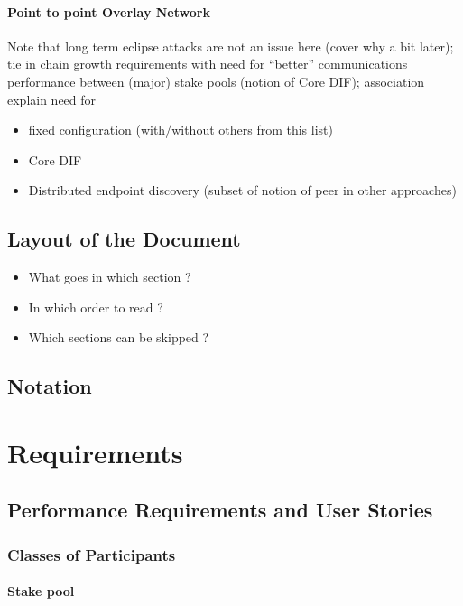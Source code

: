 \documentclass{report}
\newcommand{\wip}[1]{\color{magenta}{#1}\color{black}}
\theoremstyle{definition}{
  \newtheorem{lemma}{Lemma}[section] %
  \newtheorem{definition}[lemma]{Definition}
}
\theoremstyle{theorem}{
  \newtheorem{invariant}[lemma]{Invariant}
  \newtheorem{proofobligation}[lemma]{Proof Obligation}
}
\numberwithin{equation}{lemma}
\begin{document}
\subsubsection{Point to point Overlay Network}
 Note that long term eclipse attacks are not an issue
here (cover why a bit later); tie in chain growth requirements with
need for ``better'' communications performance between (major)
stake pools (notion of Core DIF); association explain need for
\begin{itemize}
\item fixed configuration (with/without others from this list)
\item Core DIF
\item Distributed endpoint discovery (subset of notion of peer in
  other approaches)
\end{itemize}

  
\section{Layout of the Document}

\begin{itemize}
  \item What goes in which section ?
  \item In which order to read ?
  \item Which sections can be skipped ?
\end{itemize}

\section{Notation}

\chapter{Requirements}

\section{Performance Requirements and User Stories}
\subsection{Classes of Participants}
\wip{todo: make a nice table}

\subsubsection{Stake pool} %
\end{document}
